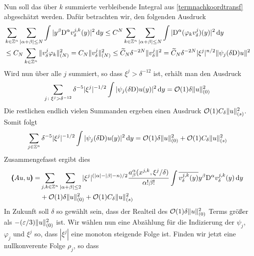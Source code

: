 Nun soll das über $k$ summierte verbleibende Integral aus \eqref{termnachkoordtransf} abgeschätzt werden. Dafür betrachten wir, den folgenden Ausdruck
\begin{align}
\label{polynomnachoben}
&\sum_{k\in\mathbb Z^n}\sum_{|\alpha+\beta|\le N} \int|y^\beta\mathrm D^\alpha v^{j,k}_\delta(y)|^2\,\mathrm d y \le C^{N} \sum_{k\in\mathbb Z^n} \sum_{|\alpha+\beta|\le N}\int |\mathrm D^\alpha(\varphi_k v^j_\delta)(y)|^2\,\mathrm d y \\
&\le C_N\sum_{k\in\mathbb Z^n}\| v^j_\delta \varphi_k\|_{(N)}^2 
= C_N\| v^j_\delta \|_{(N)}^2 \nonumber
\le \widetilde C_N \delta^{-2N}\| v^j_\delta \|^2 = \widetilde C_N \delta^{-2N}|\xi^j|^{n/2}\| \psi_j(\delta\mathrm D)u \|^2 
\end{align}
Wird nun über alle $j$ summiert, so dass $\xi^j>\delta^{-12}$ ist, erhält man den Ausdruck
\begin{align}
\sum_{j\colon \xi^j>\delta^{-12}} \delta^{-5} |\xi^j|^{-1/2}\int |\psi_j(\delta\mathrm D)u(y)|^2\,\mathrm d y = \mathcal O(1)\delta\lVert u\rVert _{(0)}^2
\end{align}
Die restlichen endlich vielen Summanden ergeben einen Ausdruck $\mathcal O(1)C_\delta \lVert u\rVert _{(s)}^2$. Somit folgt
\begin{align}
\sum_{j\in\mathbb Z^n}\delta^{-5} |\xi^j|^{-1/2}\int |\psi_j(\delta\mathrm D)u(y)|^2\,\mathrm d y = \mathcal O(1)\delta\lVert u\rVert _{(0)}^2 + \mathcal O(1)C_\delta \lVert u\rVert _{(s)}^2
\end{align}
Zusammengefasst ergibt dies
\begin{align}\label{fastfertig}
\pmb(Au,u\pmb)
=& \sum_{j,k\in\mathbb Z^n}\sum_{\lvert\alpha+\beta\rvert\le 2}|\xi^j|^{(\lvert\alpha\rvert-\lvert\beta\rvert-n)/2} \frac{a^\alpha_\beta(x^{j,k},\xi^j/\delta)}{\alpha!\beta!}\int\overline{v^{j,k}_\delta(y)}y^\beta\mathrm D^\alpha v^{j,k}_\delta(y)\,\mathrm d y\\
&+\mathcal O(1)\delta\lVert u\rVert _{(0)}^2 + \mathcal O(1)C_\delta \lVert u\rVert _{(s)}^2\nonumber
\end{align}
In Zukunft soll $\delta$ so gewählt sein, dass der Realteil des $\mathcal O(1)\delta\lVert u\rVert ^2_{(0)}$ Terms größer als $-(\varepsilon/3)\lVert u\rVert ^2_{(0)}$ ist. Wir wählen nun eine Abzählung für die Indizierung der $\psi_j$, $\varphi_j$ und $\xi^j$ so, dass $|\xi^j|$ eine monoton steigende Folge ist. Finden wir jetzt eine nullkonverente Folge $\rho_j$, so dass

